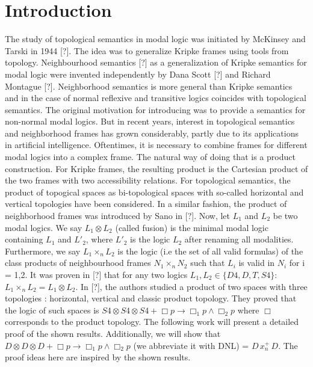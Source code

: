 \documentclass[12pt, a4paper]{scrreprt}
\begin{document}
\chapter{Introduction}
The study of topological semantics in modal logic was initiated by McKinsey and Tarski in 1944 [?]. The idea was to generalize Kripke frames using tools from topology.
 Neighbourhood semantics [?] as a generalization of Kripke semantics for modal logic were invented independently by Dana Scott [?] and Richard Montague [?].
Neighborhood semantics is more general than Kripke semantics and in the case of normal reflexive and transitive logics coincides with topological semantics.
The original motivation for introducing was to provide a semantics for non-normal modal logics. But in
recent years, interest in topological semantics and neighborhood frames has grown considerably, partly due to its applications in artificial intelligence. \newline
Oftentimes, it is necessary to combine frames for different modal logics into a complex
frame. The natural way of doing that is a product construction. For Kripke frames,
the resulting product is the Cartesian product of the two frames with two accessibility
relations. For topological semantics, the product of topogical spaces as bi-topological
spaces with so-called horizontal and vertical topologies have been considered. In a similar
fashion, the product of neighborhood frames was introduced by Sano in [?]. \newline
Now, let $L_1$ and $L_2$ be two modal logics. We say $L_1\otimes L_2$ (called fusion) is the 
minimal modal logic containing $L_1$ and $L'_2$, where $L'_2$ is the logic $L_2$ after renaming all modalities.
Furthermore, we say $L_1 \times_n L_2$ is the logic (i.e the set of all valid formulas) of the class 
products of neighbourhood frames $N_1 \times_n N_2$ such that $L_i$ is valid in $N_i$ for i = 1,2.
It was proven in [?] that for any two logics $L_1, L_2 \in \{D4,D,T,S4\}: $  $L_1\times_n L_2 = L_1 \otimes L_2$.
In [?], the authors studied a product of two spaces with three topologies : horizontal, vertical and
classic product topology. They proved that the logic of such spaces is $S4 \otimes S4 \otimes S4 + \Box p \rightarrow \Box_1 p \land \Box_2 p$
where $\Box$ corresponds to the product topology. \newline
The following work will present a detailed proof of the shown results. Additionally, we will show that $D\otimes D\otimes D + \Box p \rightarrow \Box_1 p \land \Box_2p$ 
 (we abbreviate it with DNL) = $D \,x^+_n \, D$. The proof ideas here are inspired by the shown results.
\end{document}
